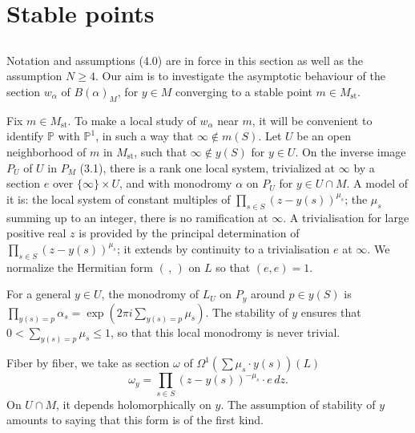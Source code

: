 \documentclass[12pt,a4paper]{article}
\theoremstyle{plain}
\theoremstyle{definition}
\theoremstyle{remark}
\newcommand{\PP}{\mathbb{P}}
\numberwithin{equation}{section}
\providecommand{\PP}{\mathbb{P}}
\begin{document}
\section{Stable points}

\subsection{}
Notation and assumptions (4.0) are in force in this section as well as the assumption $N \geq 4$. Our aim is to investigate the asymptotic behaviour of the section $w_\alpha$ of $B(\alpha)_M$, for $y \in M$ converging to a stable point $m \in M_{\mathrm{st}}$.

Fix $m \in M_{\mathrm{st}}$. To make a local study of $w_\alpha$ near $m$, it will be convenient to identify $\PP$ with $\PP^1$, in such a way that $\infty \notin m(S)$. Let $U$ be an open neighborhood of $m$ in $M_{\mathrm{st}}$, such that $\infty \notin y(S)$ for $y \in U$. On the inverse image $P_U$ of $U$ in $P_M$ (3.1), there is a rank one local system, trivialized at $\infty$ by a section $e$ over $\{\infty\} \times U$, and with monodromy $\alpha$ on $P_U$ for $y \in U \cap M$. A model of it is: the local system of constant multiples of $\prod_{s \in S} (z - y(s))^{\mu_s}$; the $\mu_s$ summing up to an integer, there is no ramification at $\infty$. A trivialisation for large positive real $z$ is provided by the principal determination of $\prod_{s \in S} (z - y(s))^{\mu_s}$; it extends by continuity to a trivialisation $e$ at $\infty$. We normalize the Hermitian form $(\,,\,)$ on $L$ so that $(e, e) = 1$.

For a general $y \in U$, the monodromy of $L_U$ on $P_y$ around $p \in y(S)$ is $\prod_{y(s) = p} \alpha_s = \exp(2\pi i \sum_{y(s) = p} \mu_s)$. The stability of $y$ ensures that $0 < \sum_{y(s) = p} \mu_s \leq 1$, so that this local monodromy is never trivial.

Fiber by fiber, we take as section $\omega$ of $\Omega^1(\sum \mu_s \cdot y(s))(L)$
\[
\omega_y = \prod_{s \in S} (z - y(s))^{-\mu_s} \cdot e \, dz.
\]
On $U \cap M$, it depends holomorphically on $y$. The assumption of stability of $y$ amounts to saying that this form is of the first kind.
\end{document}
